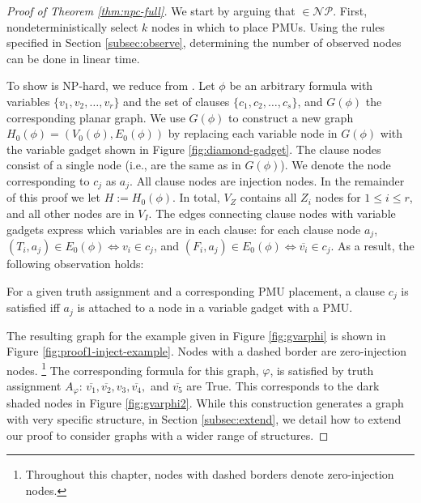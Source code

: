 \begin{proof}[Proof of Theorem \ref{thm:npc-full}]
We start by arguing that \full $\in \mathcal{NP}$. First, nondeterministically select $k$ nodes in which to place PMUs. Using the rules specified in Section \ref{subsec:observe}, determining
the number of observed nodes can be done in linear time.

To show \full is NP-hard, we reduce from \sats.  Let $\phi$ be an arbitrary \sat formula with variables 
$\{v_1,v_2, \dots , v_r\}$ and the set of clauses $\{c_1,c_2,\dots , c_s \}$, and $G(\phi)$ the corresponding planar graph. We use $G(\phi)$ to construct a new graph $H_0(\phi) = (V_0(\phi), E_0(\phi))$ by replacing each variable
node in $G(\phi)$ with the variable gadget shown in Figure \ref{fig:diamond-gadget}. The clause nodes consist of a single node (i.e., are the same
as in $G(\phi)$). We denote the node corresponding to $c_j$ as $a_j$. All clause nodes are injection nodes.  In the remainder of this proof we let $H := H_0(\phi)$.
In total, $V_Z$ contains all $Z_i$ nodes for $1 \leq i \leq r$, and all other nodes are in $V_I$.  The edges connecting clause nodes with variable gadgets express which variables are in each clause: for each clause node $a_j$, $(T_i, a_j)\in E_0(\phi) \Leftrightarrow v_i\in c_j$, and $(F_i, a_j)\in E_0(\phi) \Leftrightarrow \overline{v_i}\in c_j$. As a result, the following observation holds:

\begin{observation}\label{obs:1}
For a given truth assignment and a corresponding PMU placement, a clause $c_j$ is satisfied iff $a_j$ is attached to a node in a variable gadget with a PMU. 
\end{observation}


The resulting graph for the example given in Figure \ref{fig:gvarphi} is shown in Figure \ref{fig:proof1-inject-example}.  Nodes with a dashed border are zero-injection nodes. 
{\footnote {\small  Throughout this chapter, nodes with dashed borders denote zero-injection nodes. }} 
The corresponding formula for this graph, $\varphi$,
is satisfied by truth assignment $A_{\varphi}$: $\overline{v_1}, \overline{v_2}, v_3, \overline{v_4},$ and $\overline{v_5}$ are True. This corresponds to the dark shaded nodes in Figure
\ref{fig:gvarphi2}. While this construction generates a graph with very specific structure, in Section \ref{subsec:extend}, we detail how to extend our proof to consider graphs with a wider range of structures.%



\end{proof}

